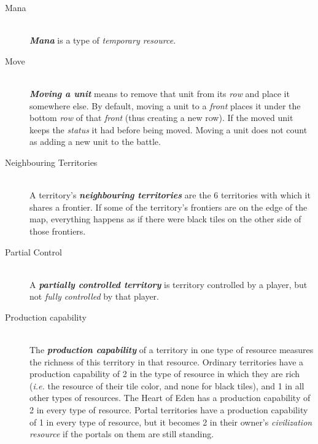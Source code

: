 \documentclass[a4paper]{article}
\begin{document}
\begin{description}
        \item[Mana] \hfill \\
            \textbf{\textit{Mana}} is a type of \textit{temporary resource}.
            
        \item[Move] \hfill \\
            \textbf{\textit{Moving a unit}} means to remove that unit from its
            \textit{row} and place it somewhere else.
            By default, moving a unit to a \textit{front} places it
            under the bottom \textit{row} of that \textit{front}
            (thus creating a new row).
            If the moved unit keeps the \textit{status} it had before being moved.
            Moving a unit does not count as adding a new unit to the battle.
            
        \item[Neighbouring Territories] \hfill \\
            A territory's \textbf{\textit{neighbouring territories}} are the 6 territories
            with which it shares a frontier.
            If some of the territory's frontiers are on the edge of the map,
            everything happens as if there were black tiles
            on the other side of those frontiers.
            
        \item[Partial Control] \hfill \\
            A \textbf{\textit{partially controlled territory}} is territory controlled
            by a player, but not \textit{fully controlled} by that player.
            
        \item[Production capability] \hfill \\
            The \textbf{\textit{production capability}} of a territory in one type
            of resource measures the richness of this territory in that resource.
            Ordinary territories have a production capability of 2 in the type of resource
            in which they are rich (\textit{i.e.} the resource of their tile color,
            and none for black tiles), and 1 in all other types of resources.
            The Heart of Eden has a production capability of 2 in every type
            of resource.
            Portal territories have a production capability of 1 in every type of resource,
            but it becomes 2 in their owner's \textit{civilization resource}
            if the portals on them are still standing.
            

\end{description}
\end{document}
